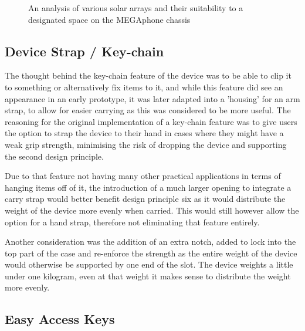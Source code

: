 \begin{figure}
    \caption{An analysis of various solar arrays and their suitability to a designated space on the MEGAphone chassis}
    \label{fig:DesignPrinciples}
\end{figure}


\subsection{Device Strap / Key-chain}

The thought behind the key-chain feature of the device was to be able to clip it to something or alternatively fix items to it, and while this feature did see an appearance in an early prototype, it was later adapted into a 'housing' for an arm strap, to allow for easier carrying as this was considered to be more useful.
The reasoning for the original implementation of a key-chain feature was to give users the option to strap the device to their hand in cases where they might have a weak grip strength, minimising the risk of dropping the device and supporting the second design principle.

Due to that feature not having many other practical applications in terms of hanging items off of it, the introduction of a much larger opening to integrate a carry strap would better benefit design principle six as it would distribute the weight of the device more evenly when carried.
This would still however allow the option for a hand strap, therefore not eliminating that feature entirely.
 
Another consideration was the addition of an extra notch, added to lock into the top part of the case and re-enforce the strength as the entire weight of the device would otherwise be supported by one end of the slot. %
The device weights a little under one kilogram, even at that weight it makes sense to distribute the weight more evenly.

\subsection{Easy Access Keys}

